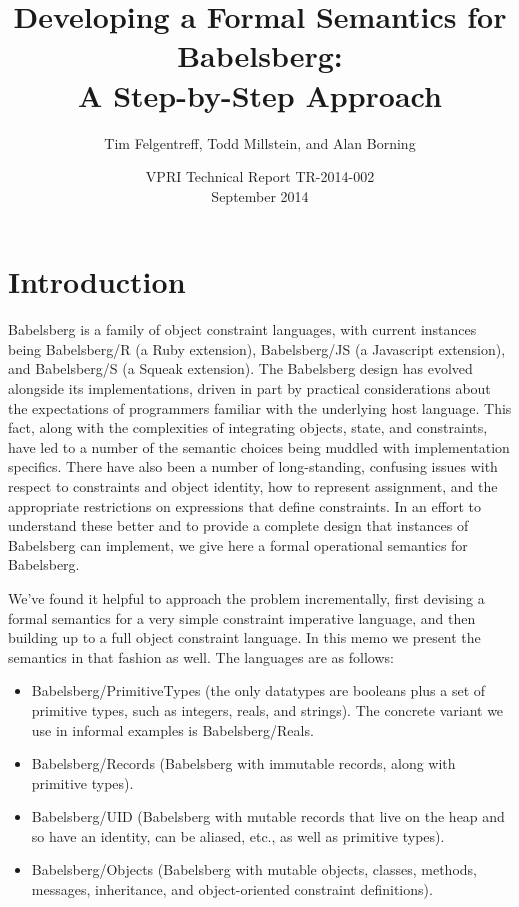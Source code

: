 \documentclass{article}
\begin{document}
\title{Developing a Formal Semantics for Babelsberg: \\ 
  A Step-by-Step Approach}
\author{Tim Felgentreff, Todd Millstein, and Alan Borning}
\date{VPRI Technical Report TR-2014-002 \\ September 2014}


\maketitle

\section{Introduction}

Babelsberg \cite{felgentreff-babelsberg-tr} is a family of object
constraint languages, with current instances being Babelsberg/R (a
Ruby extension), Babelsberg/JS \cite{felgentreff-ecoop-2014} (a
Javascript extension), and Babelsberg/S (a Squeak extension). The
Babelsberg design has evolved alongside its implementations, driven in
part by practical considerations about the expectations of programmers
familiar with the underlying host language.  This fact, along with the
complexities of integrating objects, state, and constraints, have led
to a number of the semantic choices being muddled with implementation
specifics.  There have also been a number of long-standing, confusing
issues with respect to constraints and object identity, how to
represent assignment, and the appropriate restrictions on expressions
that define constraints.  In an effort to understand these better and
to provide a complete design that instances of Babelsberg can
implement, we give here a formal operational semantics for Babelsberg.

We've found it helpful to approach the problem incrementally, first
devising a formal semantics for a very simple constraint imperative
language, and then building up to a full object constraint language.
In this memo we present the semantics in that fashion as well.  The
languages are as follows:

\begin{itemize}

\item Babelsberg/PrimitiveTypes (the only datatypes are booleans plus
  a set of primitive types, such as integers, reals, and strings).
  The concrete variant we use in informal examples is Babelsberg/Reals.
\item Babelsberg/Records (Babelsberg with immutable records, along
  with primitive types).
\item Babelsberg/UID (Babelsberg with mutable records that live on the
  heap and so have an identity, can be aliased, etc., as well as
  primitive types).
\item Babelsberg/Objects (Babelsberg with mutable objects, classes,
  methods, messages, inheritance, and object-oriented constraint
  definitions).
\end{itemize}
\end{document}
